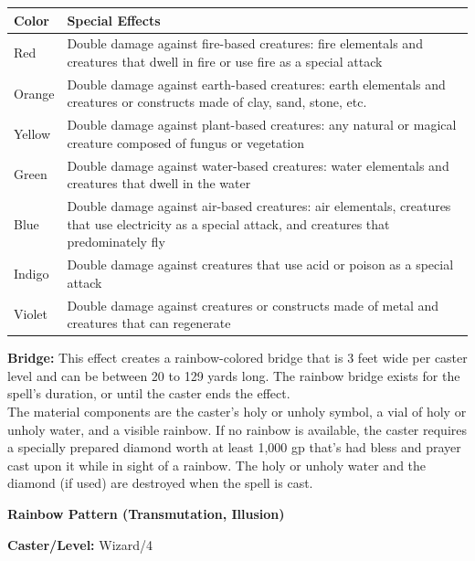 \begin{multicols}{2}
\noindent
\begin{tabular}{|p{}|p{}|}
\hline
Color	& Special Effects \\
\hline\hline
\rowcolor[gray]{0.9}Red	& Double damage against fire-based creatures: fire elementals and creatures that dwell in fire or use fire as a special attack \\
Orange	& Double damage against earth-based creatures: earth elementals and creatures or constructs made of clay, sand, stone, etc. \\
\rowcolor[gray]{0.9}Yellow	& Double damage against plant-based creatures: any natural or magical creature composed of fungus or vegetation  \\
Green	& Double damage against water-based creatures: water elementals and creatures that dwell in the water  \\
\rowcolor[gray]{0.9}Blue	& Double damage against air-based creatures: air elementals, creatures that use electricity as a special attack, and creatures that predominately fly \\
Indigo	& Double damage against creatures that use acid or poison as a special attack \\
\rowcolor[gray]{0.9}Violet	& Double damage against creatures or constructs made of metal and creatures that can regenerate \\
\hline
\end{tabular}

\textbf{Bridge:} This effect creates a rainbow-colored bridge that is 3 feet wide per caster level and can be between 20 to 129 yards long.  The rainbow bridge exists for the spell's duration, or until the caster ends the effect. \\

The material components are the caster's holy or unholy symbol, a vial of holy or unholy water, and a visible rainbow.  If no rainbow is available, the caster requires a specially prepared diamond worth at least 1,000 gp that's had bless and prayer cast upon it while in sight of a rainbow.  The holy or unholy water and the diamond (if used) are destroyed when the spell is cast.
 
\vspace{1em}

\noindent
\begin{minipage}{\columnwidth}

\noindent \textbf{Rainbow Pattern (Transmutation, Illusion)}

\noindent \textbf{Caster/Level:} Wizard/4


\end{minipage}
\end{multicols}
